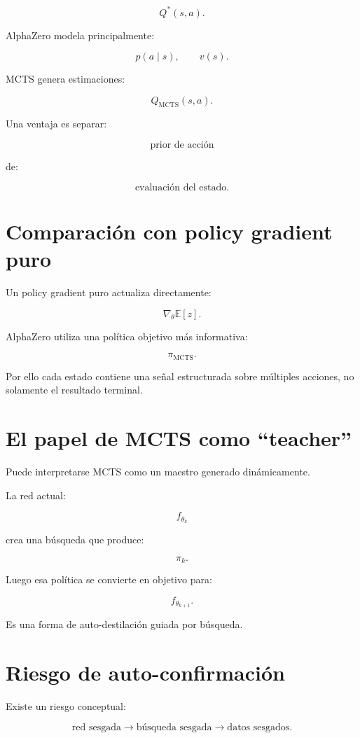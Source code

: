 \documentclass[11pt,a4paper]{article}
\newcommand{\E}{\mathbb{E}}
\begin{document}
\[
Q^*(s,a).
\]

AlphaZero modela principalmente:

\[
p(a\mid s),
\qquad
v(s).
\]

MCTS genera estimaciones:

\[
Q_{\mathrm{MCTS}}(s,a).
\]

Una ventaja es separar:

\[
\text{prior de acción}
\]

de:

\[
\text{evaluación del estado}.
\]

\section{Comparación con policy gradient puro}

Un policy gradient puro actualiza directamente:

\[
\nabla_\theta
\E[z].
\]

AlphaZero utiliza una política objetivo más informativa:

\[
\pi_{\mathrm{MCTS}}.
\]

Por ello cada estado contiene una señal estructurada sobre múltiples acciones, no solamente el resultado terminal.

\section{El papel de MCTS como ``teacher''}

Puede interpretarse MCTS como un maestro generado dinámicamente.

La red actual:

\[
f_{\theta_k}
\]

crea una búsqueda que produce:

\[
\pi_k.
\]

Luego esa política se convierte en objetivo para:

\[
f_{\theta_{k+1}}.
\]

Es una forma de auto-destilación guiada por búsqueda.

\section{Riesgo de auto-confirmación}

Existe un riesgo conceptual:

\[
\text{red sesgada}
\rightarrow
\text{búsqueda sesgada}
\rightarrow
\text{datos sesgados}.
\]
\end{document}
